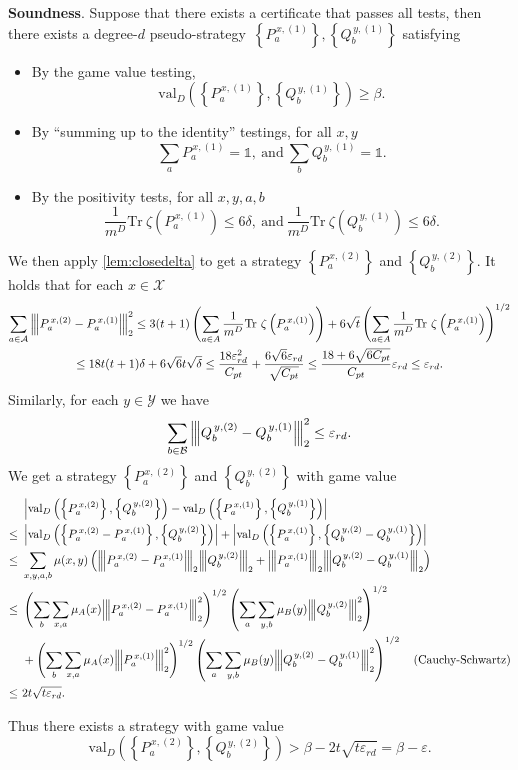 \documentclass[10pt,a4paper]{article}
\theoremstyle{plain}
\theoremstyle{definition}
\newcommand {\set} [1] {\ensuremath{ \left\lbrace #1 \right\rbrace }}
\newcommand {\br} [1] {\ensuremath{ \left( #1 \right) }}
\newcommand {\ab} [1] {\ensuremath{ \left| #1 \right| }}
\newcommand{\nnorm}[1]{{\left\vert\kern-0.25ex\left\vert\kern-0.25ex\left\vert #1
		\right\vert\kern-0.25ex\right\vert\kern-0.25ex\right\vert}}
\newcommand {\Tr} {\ensuremath{ \mathrm{Tr} }}
\newcommand {\id} {\ensuremath{\mathds{1}}}
\newcommand{\gval}[3]{\ensuremath{\mathrm{val}_{#1}\br{\set{#2},\set{#3}}}}
\newcommand{\ep} {\ensuremath{\varepsilon}}
\newcommand{\dmcc} {\ensuremath{C_{pt}}}
\newcommand{\dlbo} {\ensuremath{{D}}}
\newcommand{\eprd} {\ensuremath{\ep_{rd}}}
\newcommand{\pseudostrategy} {pseudo-strategy}
\newcommand{\Pnn}[1] {\ensuremath{{P^{\,x, (#1)}_a}}}
\newcommand{\Qnn}[1] {\ensuremath{{Q^{\,y, (#1)}_b}}}
\newcommand{\calX}{\mathcal{X}}
\newcommand{\calY}{\mathcal{Y}}
\newcommand{\calA}{\mathcal{A}}
\newcommand{\calB}{\mathcal{B}}
\newcommand{\1}{\mathbb{1}} %
\begin{document}
\textbf{Soundness}.
Suppose that there exists a certificate that passes all tests,
then there exists a degree-$d$ \pseudostrategy\ $\set{\Pnn{1}}, \set{\Qnn{1}}$ satisfying
\begin{itemize}
  \item By the game value testing,
      $$\gval{\dlbo}{\Pnn{1}}{\Qnn{1}}\ge\beta.$$
  \item By ``summing up to the identity'' testings, for all $x, y$
      $$\sum_{a}\Pnn{1}=\id,~\mbox{and}~\sum_{b}\Qnn{1}=\id.$$

  \item By the positivity tests,
      for all $x, y, a, b$
      $$\frac{1}{m^\dlbo}\Tr~\zeta\br{\Pnn{1}}\leq 6\delta,~\mbox{and}~\frac{1}{m^\dlbo}\Tr~\zeta\br{\Qnn{1}}\leq 6\delta.$$
\end{itemize}
We then apply \cref{lem:closedelta} to get a strategy
$\set{\Pnn{2}}$ and $\set{\Qnn{2}}$.
It holds that for each $x\in\calX$
\begin{multline*}
  \sum_{a\in\calA}\nnorm{\Pnn{2}-\Pnn{1}}_2^2
  \le3(t+1)\br{\sum_{a\in A}\frac{1}{m^\dlbo}\Tr~\zeta\br{\Pnn{1}}}
    +6\sqrt{t}\br{\sum_{a\in A}\frac{1}{m^\dlbo}\Tr~\zeta\br{\Pnn{1}}}^{1/2} \\
  \le 18t(t+1)\delta + 6\sqrt{6}t\sqrt{\delta}
  \le \frac{18\eprd^2}{\dmcc} + \frac{6\sqrt{6}\eprd}{\sqrt{\dmcc}}\le\frac{18+6\sqrt{6\dmcc}}{\dmcc}\eprd\le\eprd.
\end{multline*}
Similarly, for each $y\in\calY$ we have
$$\sum_{b\in\calB}\nnorm{\Qnn{2}-\Qnn{1}}_2^2\le\eprd.$$
We get a strategy $\set{\Pnn{2}}$ and $\set{\Qnn{2}}$ with game value
\begin{align*}
&\ab{\gval{D}{\Pnn{2}}{\Qnn{2}}-\gval{D}{\Pnn{1}}{\Qnn{1}}}\\
\leq~&\ab{\gval{D}{\Pnn{2}-\Pnn{1}}{\Qnn{2}}}+\ab{\gval{D}{\Pnn{1}}{\Qnn{2}-\Qnn{1}}}\\
\leq~&\sum_{x,y,a,b}\mu(x,y)\br{\nnorm{\Pnn{2}-\Pnn{1}}_2\nnorm{\Qnn{2}}_2+\nnorm{\Pnn{1}}_2\nnorm{\Qnn{2}-\Qnn{1}}_2}\\
\leq~&\br{\sum_b\sum_{x,a}\mu_A(x)\nnorm{\Pnn{2}-\Pnn{1}}_2^2}^{1/2}\br{\sum_a\sum_{y,b}\mu_B(y)\nnorm{\Qnn{2}}_2^2}^{1/2}\\
&+\br{\sum_b\sum_{x,a}\mu_A(x)\nnorm{\Pnn{1}}_2^2}^{1/2}\br{\sum_a\sum_{y,b}\mu_B(y)\nnorm{\Qnn{2}-\Qnn{1}}_2^2}^{1/2}\quad\mbox{(Cauchy-Schwartz)}\\
\le~&2t\sqrt{t\eprd}.
\end{align*}

Thus there exists a strategy with game value
$$\gval{D}{\Pnn{2}}{\Qnn{2}} >\beta - 2t\sqrt{t\eprd}=\beta - \ep.$$
\end{document}
